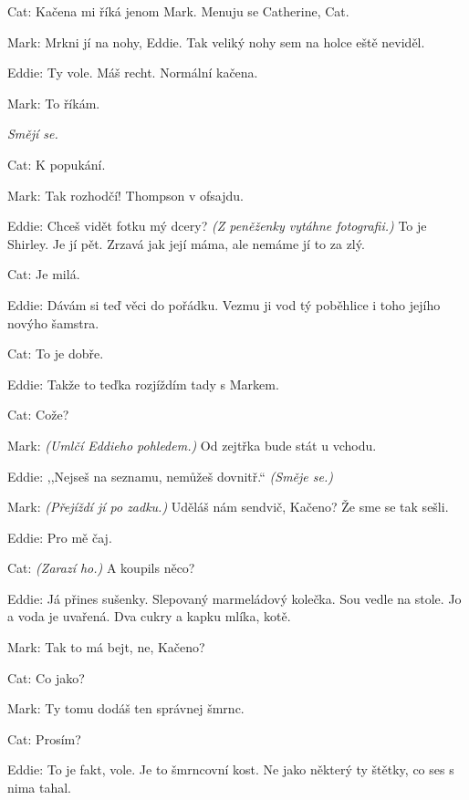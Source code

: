 \medskip
\noindent
Cat: Kačena mi říká jenom Mark. Menuju se Catherine, Cat.

\medskip
\noindent
Mark: Mrkni jí na nohy, Eddie. Tak veliký nohy sem na holce eště neviděl.

\medskip
\noindent
Eddie: Ty vole. Máš recht. Normální kačena.

\medskip
\noindent
Mark: To říkám.

\medskip
\noindent
\textit{Smějí se.}

\medskip
\noindent
Cat: K popukání.

\medskip
\noindent
Mark: Tak rozhodčí! Thompson v ofsajdu.

\medskip
\noindent
Eddie: Chceš vidět fotku mý dcery? \textit{(Z peněženky vytáhne fotografii.)} To je Shirley. Je jí pět. Zrzavá jak její máma, ale nemáme jí to za zlý.

\medskip
\noindent
Cat: Je milá.

\medskip
\noindent
Eddie: Dávám si teď věci do pořádku. Vezmu ji vod tý poběhlice i toho jejího novýho šamstra. 

\medskip
\noindent
Cat: To je dobře.

\medskip
\noindent
Eddie: Takže to teďka rozjíždím tady s Markem.

\medskip
\noindent
Cat: Cože?

\medskip
\noindent
Mark: \textit{(Umlčí Eddieho pohledem.)} Od zejtřka bude stát u vchodu.

\medskip
\noindent
Eddie: ,,Nejseš na seznamu, nemůžeš dovnitř.`` \textit{(Směje se.)}

\medskip
\noindent
Mark: \textit{(Přejíždí jí po zadku.)} Uděláš nám sendvič, Kačeno? Že sme se tak sešli.

\medskip
\noindent
Eddie: Pro mě čaj.

\medskip
\noindent
Cat: \textit{(Zarazí ho.)} A koupils něco?

\medskip
\noindent
Eddie:	Já přines sušenky. Slepovaný marmeládový kolečka. Sou vedle na stole. Jo a voda je uvařená. Dva cukry a kapku mlíka, kotě.

\medskip
\noindent
Mark: Tak to má bejt, ne, Kačeno?

\medskip
\noindent
Cat: Co jako?

\medskip
\noindent
Mark: Ty tomu dodáš ten správnej šmrnc.

\medskip
\noindent
Cat: Prosím?

\medskip
\noindent
Eddie: To je fakt, vole. Je to šmrncovní kost. Ne jako některý ty štětky, co ses s nima tahal.

